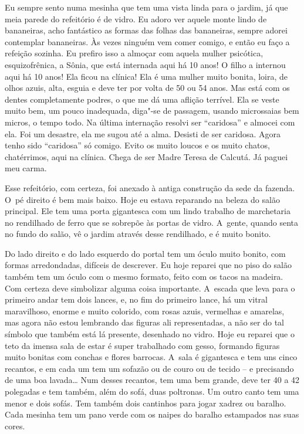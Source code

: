 Eu sempre sento numa mesinha que tem uma vista linda para o jardim, já
que meia parede do refeitório é de vidro. Eu adoro ver aquele monte
lindo de bananeiras, acho fantástico as formas das folhas das
bananeiras, sempre adorei contemplar bananeiras. Às vezes ninguém vem
comer comigo, e então eu faço a refeição sozinha. Eu prefiro isso a
almoçar com aquela mulher psicótica, esquizofrênica, a Sônia, que está
internada aqui há 10 anos! O filho a internou aqui há 10 anos! Ela ficou
 na clínica! Ela é uma mulher muito bonita, loira, de olhos
azuis, alta, esguia e deve ter por volta de 50 ou 54 anos. Mas está com
os dentes completamente podres, o que me dá uma aflição terrível. Ela se
veste muito bem, um pouco inadequada, diga"-se de passagem, usando
microssaias bem micros, o tempo todo. Na última internação resolvi ser
``caridosa'' e almocei com ela. Foi um desastre, ela me sugou até a
alma. Desisti de ser caridosa. Agora tenho sido ``caridosa'' só comigo.
Evito os muito loucos e os muito chatos, chatérrimos, aqui na clínica.
Chega de ser Madre Teresa de Calcutá. Já paguei meu carma.

Esse refeitório, com certeza, foi anexado à antiga construção da sede da
fazenda. O~pé direito é bem mais baixo. Hoje eu estava reparando na
beleza do salão principal. Ele tem uma porta gigantesca com um lindo
trabalho de marchetaria no rendilhado de ferro que se sobrepõe às portas
de vidro. A~gente, quando senta no fundo do salão, vê o jardim através
desse rendilhado, e é muito bonito.

Do lado direito e do lado esquerdo do portal tem um óculo muito bonito,
com formas arredondadas, difíceis de descrever. Eu hoje reparei que no
piso do salão também tem um óculo com o mesmo formato, feito com os
tacos na madeira. Com certeza deve simbolizar alguma coisa importante. A~escada que leva para o primeiro andar tem dois lances, e, no fim do
primeiro lance, há um vitral maravilhoso, enorme e muito colorido, com
rosas azuis, vermelhas e amarelas, mas agora não estou lembrando das
figuras ali representadas, a não ser do tal símbolo que também está lá
presente, desenhado no vidro. Hoje eu reparei que o teto da imensa sala
de estar é super trabalhado com gesso, formando figuras muito bonitas
com conchas e flores barrocas. A~sala é gigantesca e tem uns cinco
recantos, e em cada um tem um sofazão ou de couro ou de tecido -- e
precisando de uma boa lavada… Num desses recantos, tem uma  bem
grande, deve ter 40 a 42 polegadas e tem também, além do sofá, duas
poltronas. Um outro canto tem uma  menor e dois sofás. Tem também dois
cantinhos para jogar xadrez ou baralho. Cada mesinha tem um pano verde
com os naipes do baralho estampados nas suas cores.


